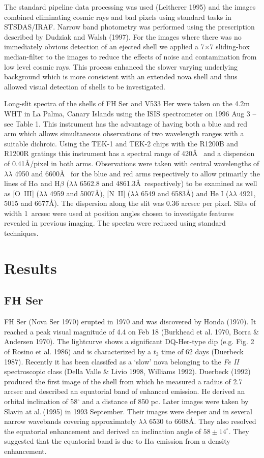 The standard pipeline data processing was used (Leitherer 1995) and the
images combined eliminating cosmic rays and bad pixels using standard 
tasks in STSDAS/IRAF. Narrow band photometry was performed using the
prescription described by Dudziak and Walsh (1997).
For the images where there was no immediately obvious detection of an ejected
shell we applied a 7$\times$7 sliding-box median-filter to the images
to reduce the effects of noise and contamination from low level cosmic
rays.  This process enhanced the slower varying underlying background
which is more consistent with an extended nova shell and thus allowed
visual detection of shells to be investigated.

Long-slit spectra of the shells of FH Ser and V533 Her 
were taken on the 4.2m WHT in La Palma,
Canary Islands using the ISIS spectrometer on 1996 Aug 3 -- see Table 1. 
This instrument has the advantage of having both a blue and red arm which
allows simultaneous observations of two wavelength ranges with a suitable
dichroic. Using the TEK-1 and TEK-2 chips with the R1200B and R1200R
gratings this instrument has a spectral range of 420\AA~ and a dispersion
of 0.41\AA/pixel in both arms. Observations were taken with central
wavelengths of $\lambda \lambda$ 4950 and 6600\AA~ for the blue and red
arms respectively to allow primarily the lines of H$\alpha$ and H$\beta$
($\lambda \lambda$ 6562.8 and 4861.3\AA~respectively) to be examined as
well as [O~III] ($\lambda \lambda$ 4959 and
5007\AA), [N~II] ($\lambda \lambda$ 6549 and 6583\AA) and  He I ($\lambda
\lambda$ 4921, 5015 and 6677\AA). The dispersion along the slit was 0.36
arcsec per pixel. Slits of width 1~arcsec 
were used at position angles chosen to investigate features
revealed in previous imaging. The spectra were reduced using 
standard techniques.

\section{Results}
\label{res}
\subsection{FH Ser}
FH Ser (Nova Ser 1970) erupted in 1970 and was discovered by Honda
(1970). It reached a peak visual magnitude of 4.4 on Feb 18 (Burkhead et al. 
1970, Borra \& Andersen 1970).
The lightcurve shows a significant 
DQ-Her-type dip (e.g. Fig. 2 of Rosino et al. 1986) and is characterized by a 
$t_3$ time of 62 days (Duerbeck 1987). 
Recently it has been classifed as a `slow' nova belonging to the 
{\it Fe II} spectroscopic class (Della Valle \& Livio 1998, 
Williams 1992).
Duerbeck (1992) produced the first image
of the shell from which he measured a radius of 2.7 arcsec and
described an equatorial band of enhanced emission. He derived an
orbital inclination of 58$^\circ$ and a distance of 850 pc. Later
images were taken by Slavin at al.\,(1995) in 1993 September. Their
images were deeper and in several narrow wavebands covering
approximately $\lambda \lambda$ 6530 to 6608\AA . They also resolved
the equatorial enhancement and derived an inclination angle of
$58\pm14^\circ$. They suggested that the equatorial band is due to
H$\alpha$ emission from a density enhancement.

